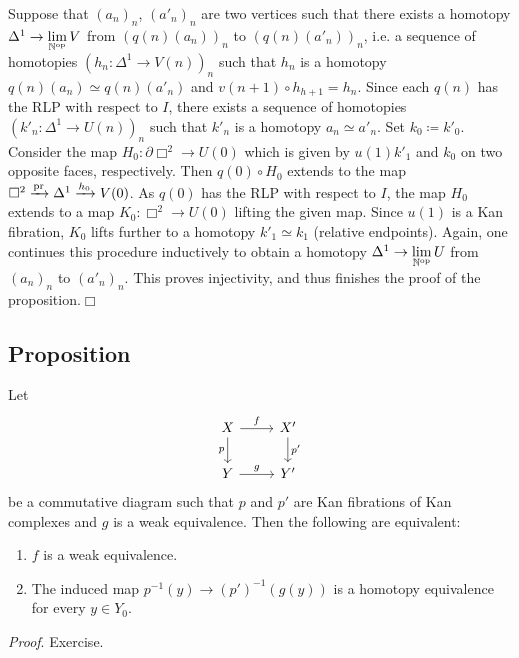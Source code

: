         Suppose that $(a_n)_n$, $(a'_n)_n$ are two vertices such that there exists a homotopy $\Delta^1 \to \lim\limits_{\mathbb{N}^{\operatorname{op}}} V$ from $(q(n)(a_n))_n$ to $(q(n)(a'_n))_n$, i.e. a sequence of homotopies $(h_n \colon \Delta^1 \to V(n))_n$ such that $h_n$ is a homotopy $q(n)(a_n) \simeq q(n)(a'_n)$ and $v(n+1) \circ h_{h+1} = h_n$. Since each $q(n)$ has the RLP with respect to $I$, there exists a sequence of homotopies $(k'_n \colon \Delta^1 \to U(n))_n$ such that $k'_n$ is a homotopy $a_n \simeq a'_n$. Set $k_0 \coloneq k'_0$.\\
        Consider the map $H_0 \colon \partial \Box^2 \to U(0)$ which is given by $u(1)k'_1$ and $k_0$ on two opposite faces, respectively. Then $q(0) \circ H_0$ extends to the map $\Box^2 \xrightarrow{\operatorname{pr}} \Delta^1 \xrightarrow{h_0} V(0)$. As $q(0)$ has the RLP with respect to $I$, the map $H_0$ extends to a map $K_0 \colon \Box^2 \to U(0)$ lifting the given map. Since $u(1)$ is a Kan fibration, $K_0$ lifts further to a homotopy $k'_1 \simeq k_1$ (relative endpoints). Again, one continues this procedure inductively to obtain a homotopy $\Delta^1 \to \lim\limits_{\mathbb{N}^{\operatorname{op}}} U$ from $(a_n)_n$ to $(a'_n)_n$. This proves injectivity, and thus finishes the proof of the proposition.\hfill$\Box$

    \subsection{Proposition}\label{chV-4-18}
        Let
        \begin{equation*}
            \begin{tikzcd}
                X \arrow[d, "p"'] \arrow[r, "f"] & X' \arrow[d, "p'"] \\
                Y \arrow[r, "g"] & Y'
            \end{tikzcd}
        \end{equation*}
        be a commutative diagram such that $p$ and $p'$ are Kan fibrations of Kan complexes and $g$ is a weak equivalence. Then the following are equivalent:
        \begin{enumerate}[label=\roman*)]
            \item 
                $f$ is a weak equivalence.
            \item 
                The induced map $p^{-1}(y) \to (p')^{-1}(g(y))$ is a homotopy equivalence for every $y \in Y_0$.
        \end{enumerate}
        \smallskip

        \emph{Proof}. Exercise.

